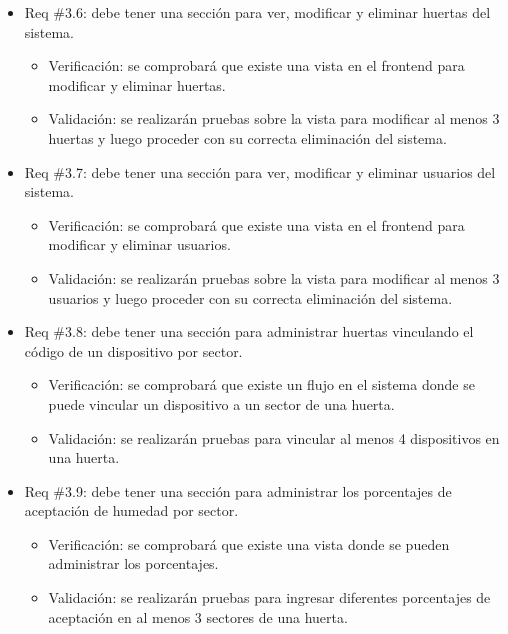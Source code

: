 \documentclass[
11pt, %
codirector, %
]{charter}
\begin{document}
\begin{itemize}
\begin{itemize}
	\item Req \#3.6: debe tener una sección para ver, modificar y eliminar huertas del sistema.
		\begin{itemize}
		\item Verificación: se comprobará que existe una vista en el frontend para modificar y eliminar huertas.
		\item Validación: se realizarán pruebas sobre la vista para modificar al menos 3 huertas y luego proceder con su correcta eliminación del sistema.\\
		\end{itemize}
		
	\item Req \#3.7: debe tener una sección para ver, modificar y eliminar usuarios del sistema.
		\begin{itemize}
		\item Verificación: se comprobará que existe una vista en el frontend para modificar y eliminar usuarios.
		\item Validación: se realizarán pruebas sobre la vista para modificar al menos 3 usuarios y luego proceder con su correcta eliminación del sistema.\\
		\end{itemize}
		
	\item Req \#3.8: debe tener una sección para administrar huertas vinculando el código de un dispositivo por sector.
		\begin{itemize}
		\item Verificación: se comprobará que existe un flujo en el sistema donde se puede vincular un dispositivo  a un sector de una huerta.
		\item Validación: se realizarán pruebas para vincular al menos 4 dispositivos en una huerta.\\
		\end{itemize}
		
	\item Req \#3.9: debe tener una sección para administrar los porcentajes de aceptación de humedad por sector.
		\begin{itemize}
		\item Verificación: se comprobará que existe una vista donde se pueden administrar los porcentajes.
		\item Validación: se realizarán pruebas para ingresar diferentes porcentajes de aceptación en al menos 3 sectores de una huerta.\\
		\end{itemize}
		

\end{itemize}
\end{itemize}
\end{document}
